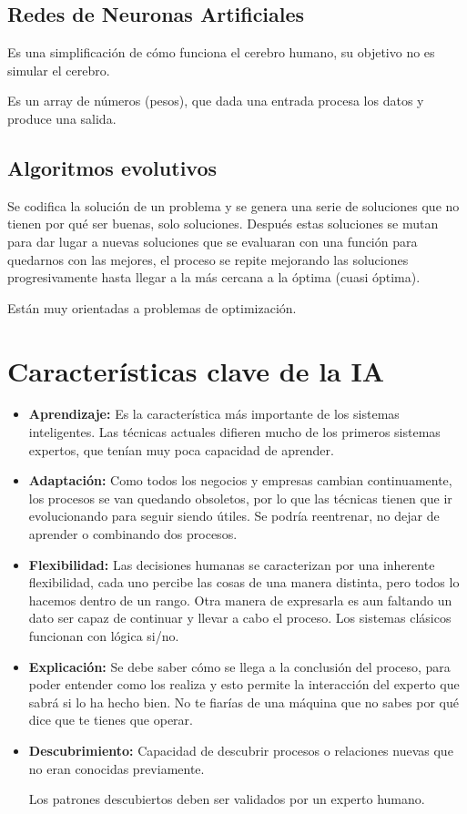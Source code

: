 \documentclass[12pt, twoside, openright]{report} %
\begin{document}
\subsection{Redes de Neuronas Artificiales}
Es una simplificación de cómo funciona el cerebro humano, su objetivo no es simular el cerebro.

Es un array de números (pesos), que dada una entrada procesa los datos y produce una salida.

\subsection{Algoritmos evolutivos}
Se codifica la solución de un problema y se genera una serie de soluciones que no tienen por qué ser buenas, solo soluciones. Después estas soluciones se mutan para dar lugar a nuevas soluciones que se evaluaran con una función para quedarnos con las mejores, el proceso se repite mejorando las soluciones progresivamente hasta llegar a la más cercana a la óptima (cuasi óptima).

Están muy orientadas a problemas de optimización.

\section{Características clave de la IA}
\begin{itemize}
	\item \textbf{Aprendizaje:} Es la característica más importante de los sistemas inteligentes. Las técnicas actuales difieren mucho de los primeros sistemas expertos, que tenían muy poca capacidad de aprender.
	\item \textbf{Adaptación:} Como todos los negocios y empresas cambian continuamente, los procesos se van quedando obsoletos, por lo que las técnicas tienen que ir evolucionando para seguir siendo útiles. Se podría reentrenar, no dejar de aprender o combinando dos procesos.
	\item \textbf{Flexibilidad:} Las decisiones humanas se caracterizan por una inherente flexibilidad, cada uno percibe las cosas de una manera distinta, pero todos lo hacemos dentro de un rango. Otra manera de expresarla es aun faltando un dato ser capaz de continuar y llevar a cabo el proceso. Los sistemas clásicos funcionan con lógica si/no.
	\item \textbf{Explicación:} Se debe saber cómo se llega a la conclusión del proceso, para poder entender como los realiza y esto permite la interacción del experto que sabrá si lo ha hecho bien. No te fiarías de una máquina que no sabes por qué dice que te tienes que operar.
	\item \textbf{Descubrimiento:} Capacidad de descubrir procesos o relaciones nuevas que no eran conocidas previamente.

	Los patrones descubiertos deben ser validados por un experto humano.
\end{itemize}
\end{document}
